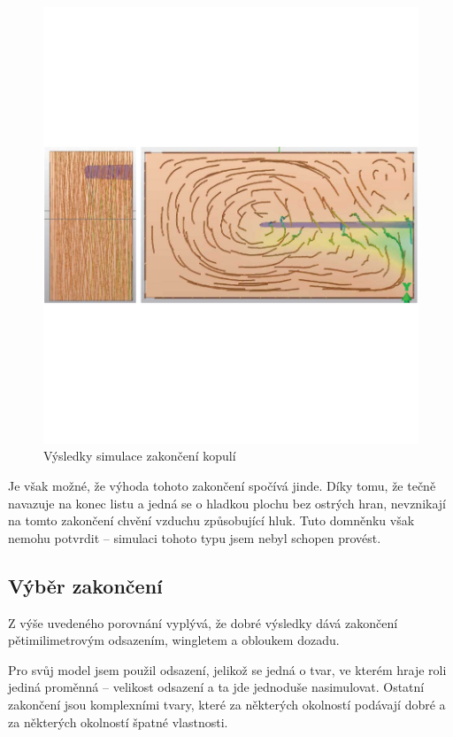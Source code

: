 \begin{figure}[H]
	\centering
	\includegraphics[]{obrazky/simulace/simulace10p}
	\caption{Výsledky simulace zakončení kopulí}
	\label{sim:10}
\end{figure}

Je však možné, že výhoda tohoto zakončení spočívá jinde. Díky tomu, že tečně navazuje na konec listu a jedná se o hladkou plochu bez ostrých hran, nevznikají na tomto zakončení chvění vzduchu způsobující hluk. Tuto domněnku však nemohu potvrdit – simulaci tohoto typu jsem nebyl schopen provést.

\subsection{Výběr zakončení}
Z výše uvedeného porovnání vyplývá, že dobré výsledky dává zakončení pětimilimetrovým odsazením, wingletem a obloukem dozadu.

Pro svůj model jsem použil odsazení, jelikož se jedná o tvar, ve kterém hraje roli jediná proměnná – velikost odsazení a ta jde jednoduše nasimulovat. Ostatní zakončení jsou komplexními tvary, které za některých okolností podávají dobré a za některých okolností špatné vlastnosti.
